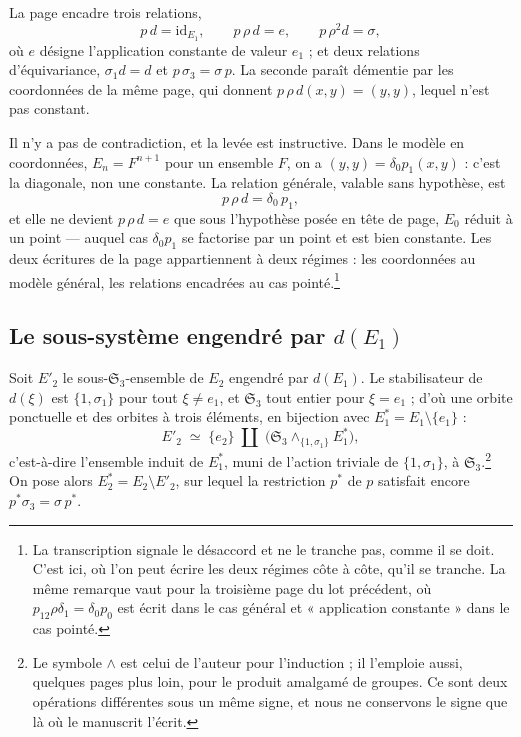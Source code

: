 \documentclass[11pt,a4paper]{article}
\begin{document}
La page encadre trois relations,
\[
  p\,d = \mathrm{id}_{E_{1}}, \qquad p\,\rho\,d = e, \qquad
  p\,\rho^{2}d = \sigma,
\]
où $e$ désigne l'application constante de valeur $e_{1}$ ; et deux relations
d'équivariance, $\sigma_{1}d = d$ et $p\,\sigma_{3} = \sigma\,p$. La seconde
paraît démentie par les coordonnées de la même page, qui donnent
$p\,\rho\,d(x,y) = (y,y)$, lequel n'est pas constant.

Il n'y a pas de contradiction, et la levée est instructive. Dans le modèle en
coordonnées, $E_{n} = F^{n+1}$ pour un ensemble $F$, on a $(y,y) =
\delta_{0}p_{1}(x,y)$ : c'est la diagonale, non une constante. La relation
générale, valable sans hypothèse, est
\[
  p\,\rho\,d = \delta_{0}\,p_{1},
\]
et elle ne devient $p\,\rho\,d = e$ que sous l'hypothèse posée en tête de page,
$E_{0}$ réduit à un point — auquel cas $\delta_{0}p_{1}$ se factorise par un
point et est bien constante. Les deux écritures de la page appartiennent à deux
régimes : les coordonnées au modèle général, les relations encadrées au cas
pointé.\footnote{La transcription signale le désaccord et ne le tranche pas,
comme il se doit. C'est ici, où l'on peut écrire les deux régimes côte à côte,
qu'il se tranche. La même remarque vaut pour la troisième page du lot
précédent, où $p_{12}\rho\delta_{1} = \delta_{0}p_{0}$ est écrit dans le cas
général et « application constante » dans le cas pointé.}

\subsection*{Le sous-système engendré par $d(E_{1})$}

Soit $E'_{2}$ le sous-$\mathfrak{S}_{3}$-ensemble de $E_{2}$ engendré par
$d(E_{1})$. Le stabilisateur de $d(\xi)$ est $\{1,\sigma_{1}\}$ pour tout
$\xi \neq e_{1}$, et $\mathfrak{S}_{3}$ tout entier pour $\xi = e_{1}$ ; d'où
une orbite ponctuelle et des orbites à trois éléments, en bijection avec
$E^{*}_{1} = E_{1} \setminus \{e_{1}\}$ :
\[
  E'_{2} \;\simeq\; \{e_{2}\} \;\amalg\;
  \bigl(\mathfrak{S}_{3} \wedge_{\{1,\sigma_{1}\}} E^{*}_{1}\bigr),
\]
c'est-à-dire l'ensemble induit de $E^{*}_{1}$, muni de l'action triviale de
$\{1,\sigma_{1}\}$, à $\mathfrak{S}_{3}$.\footnote{Le symbole $\wedge$ est celui
de l'auteur pour l'induction ; il l'emploie aussi, quelques pages plus loin, pour
le produit amalgamé de groupes. Ce sont deux opérations différentes sous un même
signe, et nous ne conservons le signe que là où le manuscrit l'écrit.} On pose
alors $E^{*}_{2} = E_{2} \setminus E'_{2}$, sur lequel la restriction
$p^{*}$ de $p$ satisfait encore $p^{*}\sigma_{3} = \sigma\,p^{*}$.
\end{document}
